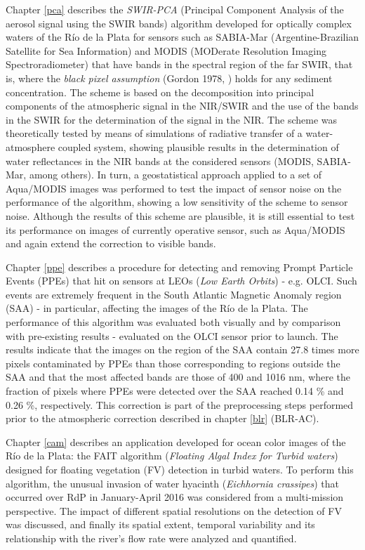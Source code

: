 Chapter \ref{pca} describes the \textit{SWIR-PCA} (Principal Component Analysis of the aerosol signal using the SWIR bands) algorithm developed for optically complex waters of the Río de la Plata for sensors such as SABIA-Mar (Argentine-Brazilian Satellite for Sea Information) and MODIS (MODerate Resolution Imaging Spectroradiometer) that have bands in the spectral region of the far SWIR, that is, where the \textit{black pixel assumption} (Gordon 1978, \cite{gordon1978}) holds for any sediment concentration. The scheme is based on the decomposition into principal components of the atmospheric signal in the NIR/SWIR and the use of the bands in the SWIR for the determination of the signal in the NIR. The scheme was theoretically tested by means of simulations of radiative transfer of a water-atmosphere coupled system, showing plausible results in the determination of water reflectances in the NIR bands at the considered sensors (MODIS, SABIA-Mar, among others). In turn, a geostatistical approach applied to a set of Aqua/MODIS images was performed to test the impact of sensor noise on the performance of the algorithm, showing a low sensitivity of the scheme to sensor noise. Although the results of this scheme are plausible, it is still essential to test its performance on images of currently operative sensor, such as Aqua/MODIS and again extend the correction to visible bands.

Chapter \ref{ppe} describes a procedure for detecting and removing Prompt Particle Events (PPEs) that hit on sensors at LEOs (\textit{Low Earth Orbits}) - e.g. OLCI. Such events are extremely frequent in the South Atlantic Magnetic Anomaly region (SAA) - in particular, affecting the images of the Río de la Plata. The performance of this algorithm was evaluated both visually and by comparison with pre-existing results - evaluated on the OLCI sensor prior to launch. The results indicate that the images on the region of the SAA contain 27.8 times more pixels contaminated by PPEs than those corresponding to regions outside the SAA and that the most affected bands are those of 400 and 1016 nm, where the fraction of pixels where PPEs were detected over the SAA reached 0.14 \% and 0.26 \%, respectively. This correction is part of the preprocessing steps performed prior to the atmospheric correction described in chapter \ref{blr} (BLR-AC).

Chapter \ref{cam} describes an application developed for ocean color images of the Río de la Plata: the FAIT algorithm (\textit{Floating Algal Index for Turbid waters}) designed for floating vegetation (FV) detection in turbid waters. To perform this algorithm, the unusual invasion of water hyacinth (\textit{Eichhornia crassipes}) that occurred over RdP in January-April 2016 was considered from a multi-mission perspective. The impact of different spatial resolutions on the detection of FV was discussed, and finally its spatial extent, temporal variability and its relationship with the river's flow rate were analyzed and quantified.

